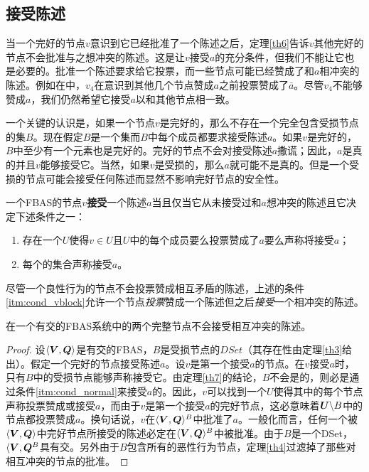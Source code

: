 \subsection{接受陈述}

当一个完好的节点$v$意识到它已经批准了一个陈述之后，定理\ref{th6}告诉$v$其他完好的节点不会批准与之想冲突的陈述。这是让$v$接受$a$的充分条件，但我们不能让它也是必要的。批准一个陈述要求给它投票，而一些节点可能已经赞成了和$a$相冲突的陈述。例如在中，$v_4$在意识到其他几个节点赞成$a$之前投票赞成了$\bar a$。尽管$v_4$不能够赞成$a$，我们仍然希望它接受$a$以和其他节点相一致。

一个关键的认识是，如果一个节点$v$是完好的，那么不存在一个完全包含受损节点的{\vblock}集$B$。现在假定$B$是一个{\vblock}集而$B$中每个成员都要求接受陈述$a$。如果$v$是完好的，$B$中至少有一个元素也是完好的。完好的节点不会对接受陈述$a$撒谎；因此，$a$是真的并且$v$能够接受它。当然，如果$v$是受损的，那么$a$就可能不是真的。但是一个受损的节点可能会接受任何陈述而显然不影响完好节点的安全性。

\begin{definition}[接受]
	一个FBAS的节点$v$\textbf{接受}一个陈述$a$当且仅当它从未接受过和$a$想冲突的陈述且它决定下述条件之一：
	\begin{enumerate}
		\item\label{itm:cond_normal} 存在一个{\quorum}$U$使得$v\in U$且$U$中的每个成员要么投票赞成了$a$要么声称将接受$a$；
		\item\label{itm:cond_vblock} 每个{\vblock}的集合声称接受$a$。 
	\end{enumerate}
\end{definition}

尽管一个良性行为的节点不会投票赞成相互矛盾的陈述，上述的条件\ref{itm:cond_vblock}允许一个节点\textit{投票}赞成一个陈述但之后\textit{接受}一个相冲突的陈述。

\begin{theorem}\label{th8}
	在一个有{\quorum}交的FBAS系统中的两个完整节点不会接受相互冲突的陈述。
\end{theorem}

\begin{proof}
	设$\langle{\bm V},{\bm Q}\rangle$是有{\quorum}交的FBAS，$B$是受损节点的$DSet$（其存在性由定理\ref{th3}给出）。假定一个完好的节点接受陈述$a$。设$v$是第一个接受$a$的节点。在$v$接受$a$时，只有$B$中的受损节点能够声称接受它。由定理\ref{th7}的结论，$B$不会是{\vblock}的，则必是通过条件\ref{itm:cond_normal}来接受$a$的。因此，$v$可以找到一个{\quorum}$U$使得其中的每个节点声称投票赞成或接受$a$，而由于$v$是第一个接受$a$的完好节点，这必意味着${\bm U}\backslash B$中的节点都投票赞成$a$。换句话说，$v$在$\langle{\bm V},{\bm Q}\rangle^{B}$中批准了$a$。一般化而言，任何一个被$\langle{\bm V},{\bm Q}\rangle$中完好节点所接受的陈述必定在$\langle{\bm V},{\bm Q}\rangle^{B}$中被批准。由于$B$是一个DSet，$\langle{\bm V},{\bm Q}^{B}$具有{\quorum}交。另外由于$B$包含所有的恶性行为节点，定理\ref{th4}过滤掉了那些对相互冲突的节点的批准。
\end{proof}